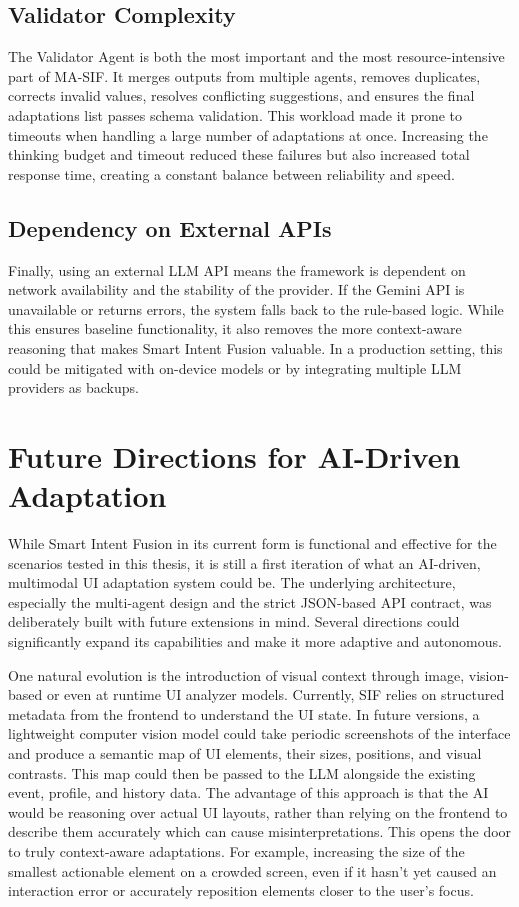 \subsection{Validator Complexity}
The Validator Agent is both the most important and the most resource-intensive part of MA-SIF. It merges outputs from multiple agents, removes duplicates, corrects invalid values, resolves conflicting suggestions, and ensures the final adaptations list passes schema validation. This workload made it prone to timeouts when handling a large number of adaptations at once. Increasing the thinking budget and timeout reduced these failures but also increased total response time, creating a constant balance between reliability and speed.

\subsection{Dependency on External APIs}
Finally, using an external LLM API means the framework is dependent on network availability and the stability of the provider. If the Gemini API is unavailable or returns errors, the system falls back to the rule-based logic. While this ensures baseline functionality, it also removes the more context-aware reasoning that makes Smart Intent Fusion valuable. In a production setting, this could be mitigated with on-device models or by integrating multiple LLM providers as backups.

\section{Future Directions for AI-Driven Adaptation}
While Smart Intent Fusion in its current form is functional and effective for the scenarios tested in this thesis, it is still a first iteration of what an AI-driven, multimodal UI adaptation system could be. The underlying architecture, especially the multi-agent design and the strict JSON-based API contract, was deliberately built with future extensions in mind. Several directions could significantly expand its capabilities and make it more adaptive and autonomous.

One natural evolution is the introduction of visual context through image, vision-based or even at runtime UI analyzer models. Currently, SIF relies on structured metadata from the frontend to understand the UI state. In future versions, a lightweight computer vision model could take periodic screenshots of the interface and produce a semantic map of UI elements, their sizes, positions, and visual contrasts. This map could then be passed to the LLM alongside the existing event, profile, and history data. The advantage of this approach is that the AI would be reasoning over actual UI layouts, rather than relying on the frontend to describe them accurately which can cause misinterpretations. This opens the door to truly context-aware adaptations. For example, increasing the size of the smallest actionable element on a crowded screen, even if it hasn’t yet caused an interaction error or accurately reposition elements closer to the user's focus.

